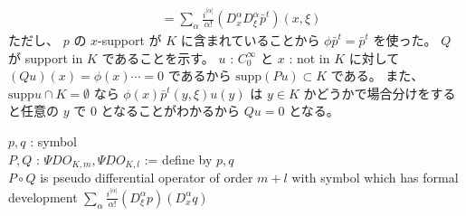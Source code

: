 \begin{Proof}
\begin{align*}
    &= \sum_{\alpha} \frac{i^{\lvert \alpha \rvert}}{\alpha !} (D^\alpha_x D^\alpha_\xi \bar{p}^t)(x , \xi)
  \end{align*}
  ただし、 \(p\) の \(x\)-support が \(K\) に含まれていることから \(\phi \bar{p}^t = \bar{p}^t\) を使った。
  \(Q\) が support in \(K\) であることを示す。
  \(u\) : \(C^\infty_0\) と \(x\) : not in \(K\) に対して \((Q u)(x) = \phi(x) \cdots = 0\) であるから \(\text{supp} (Pu) \subset K\) である。
  また、 \(\text{supp} u \cap K = \emptyset\) なら \(\phi(x)\bar{p}^t(y,\xi) u(y)\) は \(y \in K\) かどうかで場合分けをすると任意の \(y\) で \(0\) となることがわかるから \(Qu = 0\) となる。
\end{Proof}

\begin{Theorem}
\itemprop
  \For \(p,q\) : symbol \\
  \Let \(P , Q\) : \(\Psi DO_{K,m} , \Psi DO_{K,l}\) := define by \(p,q\) \\
  \Then \(P \circ Q\) is pseudo differential operator of order \(m + l\) with symbol 
  which has formal development \(\sum_{\alpha} \frac{i^{\lvert \alpha \rvert}}{\alpha !} (D^\alpha_{\xi} p) (D^\alpha_{x} q)\)
\end{Theorem}

